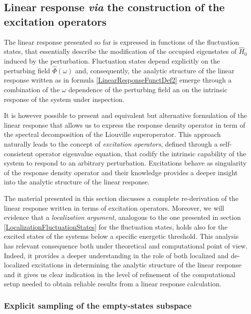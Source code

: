 \documentclass[a4paper]{article}
\newcommand{\op}[1]{\hat {#1}}
\newcommand{\hnot}{\op{H}_0}
\begin{document}
\subsection{Linear response \emph{via} the construction of the excitation operators}

The linear response presented so far is expressed in functions of the fluctuation states, that essentially describe the modification of the occupied eigenstates of $\hnot$ induced by 
the perturbation. Fluctuation states depend explicitly on the perturbing field $\op\Phi(\omega)$ and, consequently, the analytic structure of the linear response written as in formula 
\eqref{LinearResponseFunctDef2} emerge through a combination of the $\omega$ dependence of the perturbing field an on the intrinsic response of the system under inspection.    

It is however possible to present and equivalent but alternative formulation of the linear response that allows us to express the response density operator in term of the spectral
decomposition of the Liouville superoperator. This approach naturally leads to the concept of \emph{excitation operators}, defined through a self-consistent operator eigenvalue equation,
that codify the intrinsic capability of the system to respond to an arbitrary perturbation. Excitations behave as singularity of the response density operator and their knowledge provides a 
deeper insight into the analytic structure of the linear response. 

The material presented in this section discusses a complete re-derivation of the linear response written in terms of excitation operators. Moreover, we will evidence that a \emph{localization 
argument}, analogous to the one presented in section \ref{LocalizationFluctuationStates} for the fluctuation states, holds also for the excited states of the systems below a specific energetic
threshold. This analysis has relevant consequence both under theoretical and computational point of view. Indeed, it provides a deeper understanding in the role of both localized and de-localized 
excitations in determining the analytic structure of the linear response and it gives us clear indication in the level of refinement of the computational setup needed to obtain reliable results 
from a linear response calculation. 

\subsubsection{Explicit sampling of the empty-states subspace}
\end{document}
